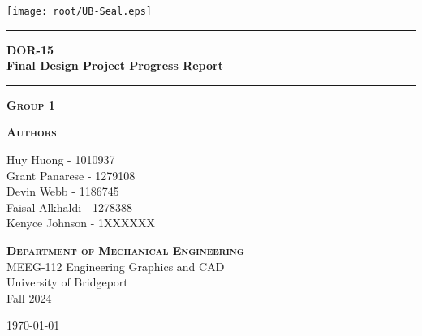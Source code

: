 
\begin{titlepage}
\begin{center}
\vspace{1 cm}
\texttt{[image: root/UB-Seal.eps]}~\\[1 cm]
\vspace{1 cm}

\hrule
\vspace{.5 cm}
{ \huge \bfseries DOR-15}
\vspace{.5 cm}
\\{\huge \bfseries Final Design Project Progress Report} %
\vspace{.5 cm}

\hrule
\vspace{1 cm}

\textsc{\textbf{Group 1}} \\

\vspace{.5 cm}

\textsc{\textbf{Authors}}\\ %
\centering

Huy Huong - 1010937\\
Grant Panarese - 1279108\\
Devin Webb - 1186745\\
Faisal Alkhaldi - 1278388\\
Kenyce Johnson - 1XXXXXX\\


\vspace{.5 cm}

\textsc{\textbf{Department of Mechanical Engineering}}\\
\centering
    MEEG-112 Engineering Graphics and CAD \\
    University of Bridgeport \\
    Fall 2024 \\

\vspace{1 cm}

\centering \today %
\end{center}
\end{titlepage}